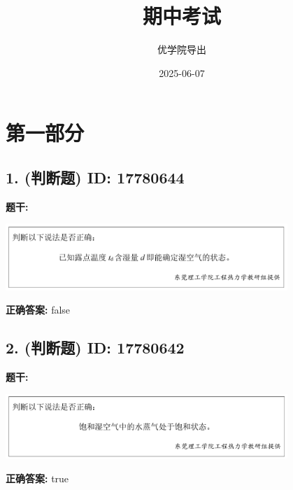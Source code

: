 \documentclass[12pt]{article}
\title{期中考试}
\author{优学院导出}
\date{2025-06-07}
\begin{document}
\maketitle

\section*{第一部分}
\hrulefill

\subsection*{1. (判断题) \small ID: 17780644}

\textbf{题干:}


\begin{center}\includegraphics[width=0.8\textwidth, height=0.25\textheight, keepaspectratio]{question_1_17780644/title_img_1.png}\end{center}

\textbf{正确答案:}
false

\vspace{0.5em}\hrulefill\vspace{1em}

\subsection*{2. (判断题) \small ID: 17780642}

\textbf{题干:}


\begin{center}\includegraphics[width=0.8\textwidth, height=0.25\textheight, keepaspectratio]{question_2_17780642/title_img_1.png}\end{center}

\textbf{正确答案:}
true

\vspace{0.5em}\hrulefill\vspace{1em}
\end{document}

